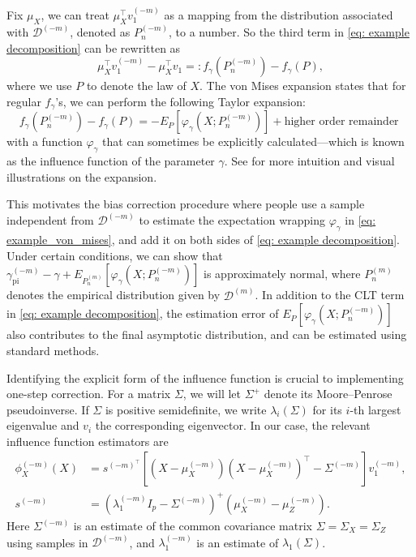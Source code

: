\documentclass[11pt]{article}
\begin{document}
Fix $\mu_X$, we can treat $\mu_X^\top v_1^{(-m)}$ as a mapping from the distribution associated with $\mathcal{D}^{(-m)}$, denoted as $P_n^{(-m)}$, to a number. 
So the third term in \eqref{eq: example decomposition} can be rewritten as
\begin{equation*}
\mu_X^{\top}v_1^{(-m)}-\mu_X^{\top}v_1 =: f_\gamma(P_n^{(-m)}) - f_\gamma(P),
\end{equation*}
where we use $P$ to denote the law of $X$. The von Mises expansion states that for regular $f_{\gamma}$'s, we can perform the following Taylor expansion:
\begin{equation}\label{eq: example_von_mises}
   f_\gamma(P_n^{(-m)}) - f_\gamma(P) = -E_P[\varphi_\gamma(X;P_n^{(-m)})] + \text{higher order remainder }
\end{equation}
with a function $\varphi_\gamma$ that can sometimes be explicitly calculated---which is known as the influence function of the parameter $\gamma$. See \cite{fisher2021visually} for more intuition and visual illustrations on the expansion.

This motivates the bias correction procedure where people use a sample independent from $\mathcal{D}^{(-m)}$ to estimate the expectation wrapping $\varphi_\gamma$ in \eqref{eq: example_von_mises}, and add it on both sides of \eqref{eq: example decomposition}. Under certain conditions, we can show that 
$
\gamma_{\mathrm{pi}}^{(-m)}-\gamma+E_{P_n^{(m)}}\left[\varphi_\gamma\left(X ; P_n^{(-m)}\right)\right]
$
is approximately normal, where $P_n^{(m)}$ denotes the empirical distribution given by $\mathcal D^{(m)}$. In addition to the CLT term in \eqref{eq: example decomposition}, the estimation error of $E_P\left[\varphi_\gamma\left(X ; P_n^{(-m)}\right)\right]$ also contributes to the final asymptotic distribution, and can be estimated using standard methods. 

Identifying the explicit form of the influence function is crucial to implementing one-step correction. For a matrix $\Sigma$, we will let $\Sigma^{+}$ denote its Moore–Penrose pseudoinverse. If $\Sigma$ is positive semidefinite, we write $\lambda_i(\Sigma)$ for its $i$-th largest eigenvalue and $v_i$ the corresponding eigenvector. In our case, the relevant influence function estimators are 
\begin{equation}\label{eq: definition nuisance}
\begin{aligned}
\phi_X^{(-m)}(X) & =s^{(-m)^{\top}}\left[\left(X-\mu_X^{(-m)}\right)\left(X-\mu_X^{(-m)}\right)^{\top}-\Sigma^{(-m)}\right] v_1^{(-m)}, \\
s^{(-m)} & =\left(\lambda_1^{(-m)} I_p-\Sigma^{(-m)}\right)^{+}\left(\mu_X^{(-m)}-\mu_Z^{(-m)}\right) .
\end{aligned}
\end{equation}
Here $\Sigma^{(-m)}$ is an estimate of the common covariance matrix $\Sigma = \Sigma_X = \Sigma_Z$ using samples in $\mathcal{D}^{(-m)}$, and $\lambda_1^{(-m)}$ is an estimate of $\lambda_1(\Sigma)$. 
\end{document}
